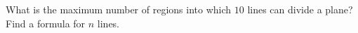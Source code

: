 What is the maximum number of regions into which $10$ lines can divide a plane? Find a formula for $n$ lines.
